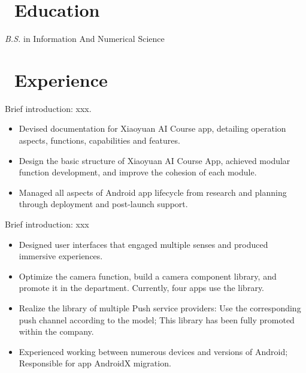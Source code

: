 \documentclass{resume}
\begin{document}



\section{\faGraduationCap\ Education}
\textit{B.S.} in Information And Numerical Science

\section{\faUsers\ Experience}
Brief introduction: xxx.
\begin{itemize}
  \item Devised documentation for Xiaoyuan AI Course app, detailing operation aspects, functions, capabilities and features.
  \item Design the basic structure of Xiaoyuan AI Course App, achieved modular function development, and improve the cohesion of each module.
  \item Managed all aspects of Android app lifecycle from research and planning through deployment and post-launch support.
\end{itemize}

Brief introduction: xxx
\begin{itemize}
  \item Designed user interfaces that engaged multiple senses and produced immersive experiences.
  \item Optimize the camera function, build a camera component library, and promote it in the department. Currently, four apps use the library.
  \item Realize the library of multiple Push service providers: Use the corresponding push channel according to the model; This library has been fully promoted within the company.
  \item Experienced working between numerous devices and versions of Android; Responsible for app AndroidX migration.
\end{itemize}
\end{document}
